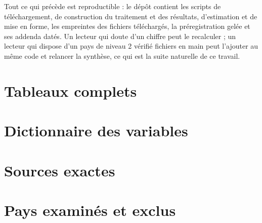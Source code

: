 \documentclass[11pt,a4paper]{article}
\begin{document}
Tout ce qui précède est reproductible : le dépôt contient les scripts de téléchargement, de construction du traitement et des résultats, d'estimation et de mise en forme, les empreintes des fichiers téléchargés, la préregistration gelée et ses addenda datés. Un lecteur qui doute d'un chiffre peut le recalculer ; un lecteur qui dispose d'un pays de niveau 2 vérifié fichiers en main peut l'ajouter au même code et relancer la synthèse, ce qui est la suite naturelle de ce travail.






\appendix
\section{Tableaux complets}


























\section{Dictionnaire des variables}


\section{Sources exactes}


\section{Pays examinés et exclus}

\end{document}
